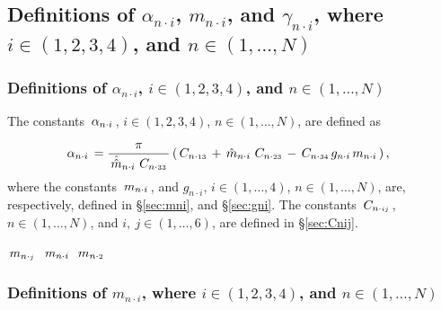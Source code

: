 \documentclass[preprint,12pt,times,draft]{elsarticle}
\newcommand{\plus}[1]{\hat{#1}}
\newcommand{\plusplus}[1]{\plus{\plus{#1}}}
\numberwithin{equation}{section}
\newcommand{\msub}[2]{
\IfEqCase{#2}{
      {i}{\, m_{#1\cdot #2}\,}%
  }[\,m_{#1\cdot {\scriptscriptstyle #2}}\,]}
\newcommand{\gsub}[2]{g_{#1\cdot #2}}
\newcommand{\Csub}[2]{
   \IfEqCase{#2}{
          {xxxx}{\,\beta_{ {#1}\cdot { #2}}\,}%
      }[\,C_{ {#1}\cdot {\scriptscriptstyle #2}}\,]}
\newcommand{\alphasub}[2]{
\IfEqCase{#2}{
		{i}{\,\alpha_{ {#1}\cdot { \scriptstyle #2}}\,}%
	}[\,\alpha_{ {#1}\cdot {\scriptscriptstyle #2}}\,]}
\newcommand{\infour}{\in(1,\ldots,4)}
\newcommand{\insix}{\in(1,\ldots,6)}
\newcommand{\inN}{\in(1,\ldots,N)}
\newcommand{\Subs}[3]{
\IfEqCase{#3}{
		{i}{\,#1_{ {#2}\cdot { \scriptstyle #3}}\,}%
	}[\,#1_{ {#2}\cdot {\scriptscriptstyle #3}}\,]}
\renewcommand{\>}{$\Rightarrow$}
\begin{document}
\subsection{Definitions of $\alpha_{n\cdot i}$, $m_{n\cdot i}$, and $\gamma_{n\cdot i}$, where $i\in (1,2,3,4)$, and $n\in (1,\ldots,N)$\label{sec:alphamgni}}


\subsubsection{Definitions of $\alpha_{n\cdot i}$, $i\in (1,2,3,4)$, and $n\in (1,\ldots,N)$\label{sec:alphani}}

The constants $\alphasub{n}{i}$, $i\in (1,2,3,4)$, $n\in (1,\ldots,N)$, are defined as

\begin{align}
	\alphasub{n}{i} & = \frac{\pi}{\Subs{\plusplus{m}}{n}{i} \Csub{n}{33}}\left(\Csub{n}{13} + \Subs{\plus{m}}{n}{i}\Csub{n}{23} - \Csub{n}{34} \gsub{n}{i} \msub{n}{i}\right),
\label{eq:alphani}
\end{align}
where the constants $\msub{n}{i}$, and $\gsub{n}{i}$, $i\infour$, $n\inN$, are, respectively, defined in \S\ref{sec:mni}, and \S\ref{sec:gni}. The constants $\Csub{n}{ij}$, $n\inN$, and $i,~j\insix$, are defined in \S\ref{sec:Cnij}.

$\Subs{m}{n}{j}$
$\Subs{m}{n}{i}$
$\Subs{m}{n}{2}$

\subsubsection{Definitions of $m_{n\cdot i}$, where $i\in (1,2,3,4)$, and $n\in(1,\ldots,N)$\label{sec:mni}}
\end{document}
